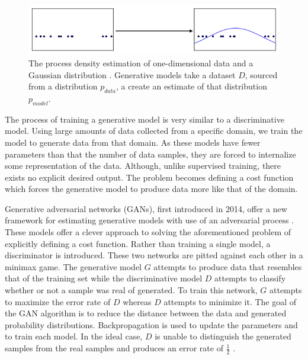 \documentclass[11pt]{article}
\begin{document}
\begin{figure}
\centering
\includegraphics[scale=0.7]{pdf}
\caption{The process density estimation of one-dimensional data and a Gaussian distribution \citep{2017arXiv170100160G}. Generative models take a dataset $D$, sourced from a distribution $p_{data}$, a create an estimate of that distribution $p_{model}$.}
\label{fig:pdf}
\end{figure}

The process of training a generative model is very similar to a discriminative model. Using large amounts of data collected from a specific domain, we train the model to generate data from that domain. As these models have fewer parameters than that the number of data samples, they are forced to internalize some representation of the data. Although, unlike supervised training, there exists no explicit desired output. The problem becomes defining a cost function which forces the generative model to produce data more like that of the domain.

Generative adversarial networks (GANs), first introduced in 2014, offer a new framework for estimating generative models with use of an adversarial process \citep{2014arXiv1406.2661G}. These models offer a clever approach to solving the aforementioned problem of explicitly defining a cost function. Rather than training a single model, a discriminator is introduced. These two networks are pitted against each other in a minimax game. The generative model $G$ attempts to produce data that resembles that of the training set while the discriminative model $D$ attempts to classify whether or not a sample was real of generated. To train this network, $G$ attempts to maximize the error rate of $D$ whereas $D$ attempts to minimize it. The goal of the GAN algorithm is to reduce the distance between the data and generated probability distributions. Backpropagation is used to update the parameters and to train each model. In the ideal case, $D$ is unable to distinguish the generated samples from the real samples and produces an error rate of $\frac{1}{2}$ \citep{2014arXiv1406.2661G}.
\end{document}
